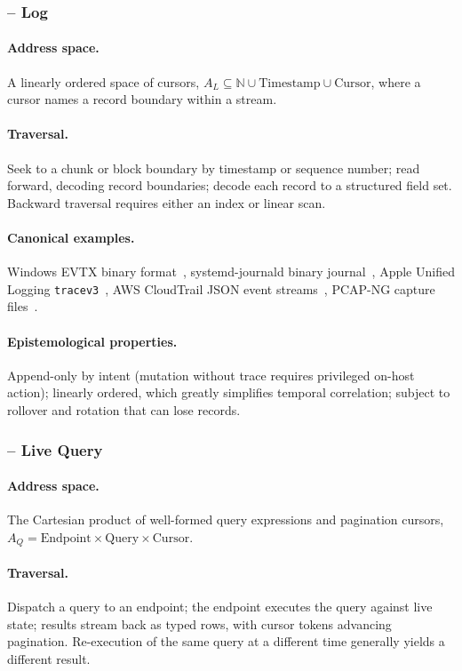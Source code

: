 \subsubsection{ -- Log}

\paragraph{Address space.} A linearly ordered space of cursors, $A_{L}
\subseteq \mathbb{N} \cup \mathrm{Timestamp} \cup \mathrm{Cursor}$, where a
cursor names a record boundary within a stream.
\paragraph{Traversal.} Seek to a chunk or block boundary by timestamp or
sequence number; read forward, decoding record boundaries; decode each record
to a structured field set. Backward traversal requires either an index or
linear scan.
\paragraph{Canonical examples.} Windows EVTX binary
format~\cite{microsoft2023evtx}, systemd-journald binary
journal~\cite{poettering2012journal}, Apple Unified Logging
\texttt{tracev3}~\cite{apple2016unifiedlogging}, AWS CloudTrail JSON event
streams~\cite{aws2024cloudtrail}, PCAP-NG capture
files~\cite{pcapng2024}.
\paragraph{Epistemological properties.} Append-only by intent (mutation
without trace requires privileged on-host action); linearly ordered, which
greatly simplifies temporal correlation; subject to rollover and rotation
that can lose records.

\subsubsection{ -- Live Query}

\paragraph{Address space.} The Cartesian product of well-formed query
expressions and pagination cursors, $A_{Q} = \mathrm{Endpoint} \times
\mathrm{Query} \times \mathrm{Cursor}$.
\paragraph{Traversal.} Dispatch a query to an endpoint; the endpoint
executes the query against live state; results stream back as typed rows,
with cursor tokens advancing pagination. Re-execution of the same query at a
different time generally yields a different result.
